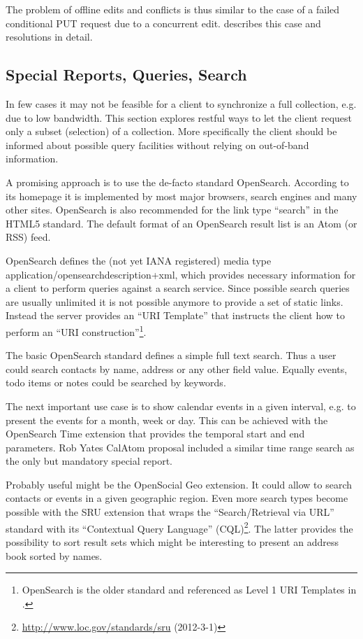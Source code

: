 \documentclass[12pt,a4paper,twoside]{scrartcl}		%
\newcommand{\citeurl}[2]{\url{#1} (#2)}
\begin{document}
The problem of offline edits and conflicts is thus similar to the case of a
failed conditional PUT request due to a concurrent edit. \cite{Nielsen1999}
describes this case and resolutions in detail.


\subsection{Special Reports, Queries, Search}
\label{sec:spec-reports-search}

In few cases it may not be feasible for a client to synchronize a full
collection, e.g. due to low bandwidth. This section explores restful ways to let
the client request only a subset (selection) of a collection. More specifically
the client should be informed about possible query facilities without relying on
out-of-band information.

A promising approach is to use the de-facto standard
OpenSearch\cite{Clinton}. According to its homepage it is implemented by most
major browsers, search engines and many other sites. OpenSearch is also
recommended for the link type ``search'' in the HTML5
standard\cite[sec. 4.12.4.12]{Hickson2011a}. The default format of an OpenSearch
result list is an Atom (or RSS) feed.

OpenSearch defines the (not yet IANA registered) media type
application/opensearchdescription+xml, which provides necessary information for
a client to perform queries against a search service. Since possible search
queries are usually unlimited it is not possible anymore to provide a set of
static links. Instead the server provides an ``URI Template''\cite{RFC6570}
that instructs the client how to perform an ``URI
construction''\footnote{OpenSearch is the older standard and referenced as Level
  1 URI Templates in \cite{RFC6570}.}.

The basic OpenSearch standard defines a simple full text search. Thus a user
could search contacts by name, address or any other field value. Equally events,
todo items or notes could be searched by keywords.

The next important use case is to show calendar events in a given interval,
e.g. to present the events for a month, week or day. This can be achieved with
the OpenSearch Time extension that provides the temporal start and end
parameters. Rob Yates CalAtom\cite{draft-yates-atompub-calatom-00.txt} proposal
included a similar time range search as the only but mandatory special report.

Probably useful might be the OpenSocial Geo extension. It could allow to search
contacts or events in a given geographic region. Even more search types become
possible with the SRU extension that wraps the ``Search/Retrieval via URL''
standard with its ``Contextual Query Language''
(CQL)\footnote{\citeurl{http://www.loc.gov/standards/sru}{2012-3-1}}. The latter
provides the possibility to sort result sets which might be interesting to
present an address book sorted by names.
\end{document}
